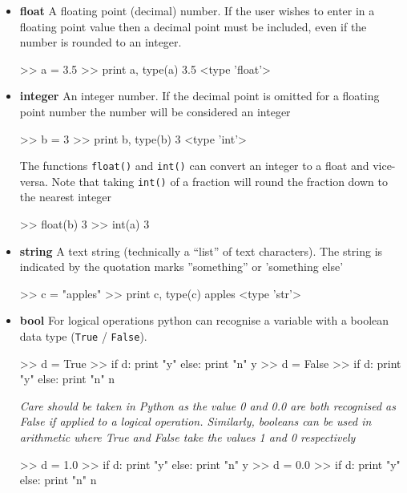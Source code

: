 \begin{itemize}
\item \textbf{float} A floating point (decimal) number. If the user wishes to enter in a floating point value then a decimal point must be included, even if the number is rounded to an integer.

\begin{python}[frame=single]
>> a = 3.5
>> print a, type(a)
3.5 <type 'float'>
\end{python}

\item \textbf{integer} An integer number. If the decimal point is omitted for a floating point number the number will be considered an integer

\begin{python}[frame=single]
>> b = 3
>> print b, type(b)
3 <type 'int'>
\end{python}

The functions \verb=float()= and \verb=int()= can convert an integer to a float and vice-versa. Note that taking \verb=int()= of a fraction will round the fraction down to the nearest integer

\begin{python}[frame=single]
>> float(b)
3
>> int(a)
3
\end{python}

\item \textbf{string} A text string (technically a ``list'' of text characters). The string is indicated by the quotation marks ''something'' or 'something else'

\begin{python}[frame=single]
>> c = "apples"
>> print c, type(c)
apples <type 'str'>
\end{python}

\item \textbf{bool} For logical operations python can recognise a variable with a boolean data type (\verb=True= / \verb=False=).

\begin{python}[frame=single]
>> d = True
>> if d:
       print "y"
   else:
       print "n"
y
>> d = False
>> if d:
       print "y"
   else:
       print "n"
n
\end{python}

\emph{Care should be taken in Python as the value 0 and 0.0 are both recognised as False if applied to a logical operation. Similarly, booleans can be used in arithmetic where True and False take the values 1 and 0 respectively}

\begin{python}[frame=single]
>> d = 1.0
>> if d:
       print "y"
   else:
       print "n"
y
>> d = 0.0
>> if d:
       print "y"
   else:
       print "n"
n
\end{python}
\end{itemize}

